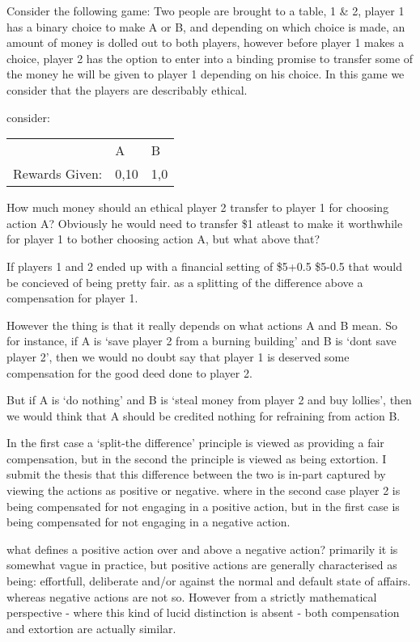\documentclass{article}
\begin{document}
Consider the following game: Two people are brought to a table, 1 \& 2, player 1 has a binary choice to make A or B, and depending on which choice is made, an amount of money is dolled out to both players, however before player 1 makes a choice, player 2 has the option to enter into a binding promise to transfer some of the money he will be given to player 1 depending on his choice. In this game we consider that the players are describably ethical.

consider:

\begin{table}[h!]
\begin{tabular}{lll}
               & A   & B   \\
Rewards Given: & 0,10 & 1,0
\end{tabular}
\end{table}

How much money should an ethical player 2 transfer to player 1 for choosing action A?
Obviously he would need to transfer \$1 atleast to make it worthwhile for player 1 to bother choosing action A, but what above that?

If players 1 and 2 ended up with a financial setting of \$5+0.5 \$5-0.5 that would be concieved of being pretty fair. as a splitting of the difference above a compensation for player 1.

However the thing is that it really depends on what actions A and B mean.
So for instance, if A is `save player 2 from a burning building' and B is `dont save player 2', then we would no doubt say that player 1 is deserved some compensation for the good deed done to player 2.

But if A is `do nothing' and B is `steal money from player 2 and buy lollies', then we would think that A should be credited nothing for refraining from action B.

In the first case a `split-the difference' principle is viewed as providing a fair compensation, but in the second the principle is viewed as being extortion.
I submit the thesis that this difference between the two is in-part captured by viewing the actions as positive or negative. where in the second case player 2 is being compensated for not engaging in a positive action, but in the first case is being compensated for not engaging in a negative action.

what defines a positive action over and above a negative action?
primarily it is somewhat vague in practice, but positive actions are generally characterised as being: effortfull, deliberate and/or against the normal and default state of affairs. whereas negative actions are not so.
However from a strictly mathematical perspective - where this kind of lucid distinction is absent - both compensation and extortion are actually similar.
\end{document}
